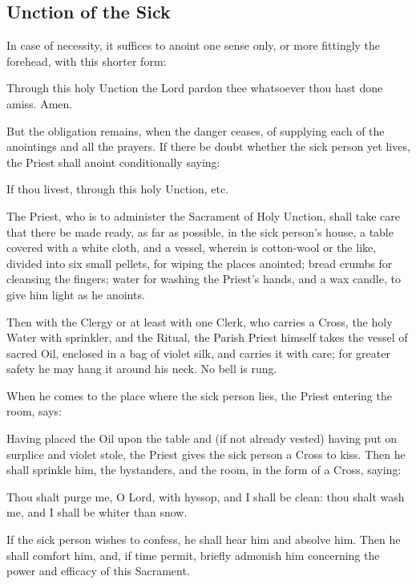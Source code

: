 \subsection{Unction of the Sick}
\begin{rubric}
    In case of necessity, it suffices to anoint one sense only, or more fittingly the forehead, with this shorter form:
\end{rubric}
\noindent
Through this holy {} Unction the Lord pardon thee whatsoever thou hast done amiss. Amen.
\begin{rubric}
    But the obligation remains, when the danger ceases, of supplying each of the anointings and all the prayers. If there be doubt whether the sick person yet lives, the Priest shall anoint conditionally saying:
\end{rubric}\par\noindent
If thou livest, through this holy {} Unction, etc.
\begin{rubric}
    The Priest, who is to administer the Sacrament of Holy Unction, shall take care that there be made ready, as far as possible, in the sick person's house, a table covered with a white cloth, and a vessel, wherein is cotton-wool or the like, divided into six small pellets, for wiping the places anointed; bread crumbs for cleansing the fingers; water for washing the Priest's hands, and a wax candle, to give him light as he anoints.
\end{rubric}
\begin{rubric}
    Then with the Clergy or at least with one Clerk, who carries a Cross, the holy Water with sprinkler, and the Ritual, the Parish Priest himself takes the vessel of sacred Oil, enclosed in a bag of violet silk, and carries it with care; for greater safety he may hang it around his neck. No bell is rung.
\end{rubric}
\begin{rubric}
    When he comes to the place where the sick person lies, the Priest entering the room, says:
\end{rubric}



\begin{rubric}
    Having placed the Oil upon the table and (if not already vested) having put on surplice and violet stole, the Priest gives the sick person a Cross to kiss. Then he shall sprinkle him, the bystanders, and the room, in the form of a Cross, saying:
\end{rubric}\par\noindent
Thou shalt purge me, O Lord, with hyssop, and I shall be clean: thou shalt wash me, and I shall be whiter than snow.
\begin{rubric}
    If the sick person wishes to confess, he shall hear him and absolve him. Then he shall comfort him, and, if time permit, briefly admonish him concerning the power and efficacy of this Sacrament.
\end{rubric}

